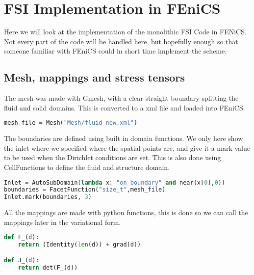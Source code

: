 
\chapter{FSI Implementation in FEniCS}
Here we will look at the implementation of the monolithic FSI Code in FENiCS. Not every part of the code will be handled here, but hopefully enough so that someone familiar with FEniCS could in short time implement the scheme.

\section{Mesh, mappings and stress tensors}
The mesh was made with Gmesh, with a clear straight boundary splitting the fluid and solid domains. This is converted to a xml file and loaded into FEniCS. 
\begin{lstlisting}[language=Python, basicstyle=\small]
mesh_file = Mesh("Mesh/fluid_new.xml")
\end{lstlisting}

The boundaries are defined using built in domain functions. We only here show the inlet where we specified where the spatial points are, and give it a mark value to be used when the Dirichlet conditions are set. This is also done using CellFunctions to define the fluid and structure domain. 

\begin{lstlisting}[language=Python,basicstyle=\small]
Inlet = AutoSubDomain(lambda x: "on_boundary" and near(x[0],0))
boundaries = FacetFunction("size_t",mesh_file)
Inlet.mark(boundaries, 3)
\end{lstlisting}


All the mappings are made with python functions, this is done so we can call the mappings later in the variational form.

\begin{lstlisting}[language=Python, basicstyle=\small]
def F_(d):
	return (Identity(len(d)) + grad(d))

def J_(d):
	return det(F_(d))
\end{lstlisting}


